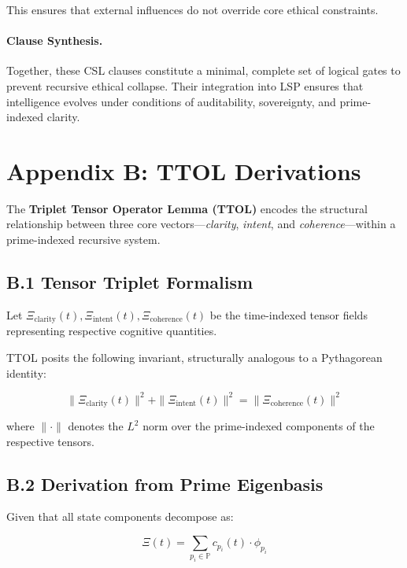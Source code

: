 \documentclass[12pt]{article}
\begin{document}
This ensures that external influences do not override core ethical constraints.

\paragraph{Clause Synthesis.}
Together, these CSL clauses constitute a minimal, complete set of logical gates to prevent recursive ethical collapse. Their integration into LSP ensures that intelligence evolves under conditions of auditability, sovereignty, and prime-indexed clarity.

\clearpage

\section*{Appendix B: TTOL Derivations}

The \textbf{Triplet Tensor Operator Lemma (TTOL)} encodes the structural relationship between three core vectors—\textit{clarity}, \textit{intent}, and \textit{coherence}—within a prime-indexed recursive system.

\subsection*{B.1 Tensor Triplet Formalism}

Let $\Xi_{\text{clarity}}(t), \Xi_{\text{intent}}(t), \Xi_{\text{coherence}}(t)$ be the time-indexed tensor fields representing respective cognitive quantities.

TTOL posits the following invariant, structurally analogous to a Pythagorean identity:

\begin{equation}
\|\Xi_{\text{clarity}}(t)\|^2 + \|\Xi_{\text{intent}}(t)\|^2 = \|\Xi_{\text{coherence}}(t)\|^2
\label{eq:ttol_base}
\end{equation}

\noindent
where $\| \cdot \|$ denotes the $L^2$ norm over the prime-indexed components of the respective tensors.

\subsection*{B.2 Derivation from Prime Eigenbasis}

Given that all state components decompose as:

\begin{equation}
\Xi(t) = \sum_{p_i \in \mathbb{P}} c_{p_i}(t) \cdot \phi_{p_i}
\end{equation}
\end{document}
